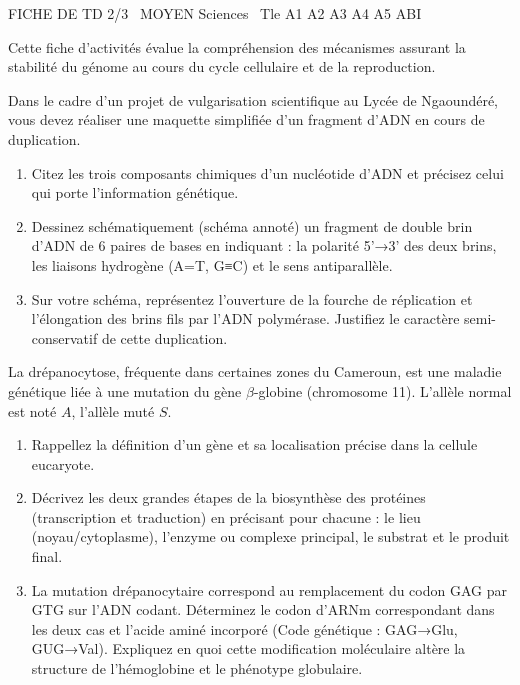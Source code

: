 \documentclass[11pt]{article}
\begin{document}
\begin{tcolorbox}[enhanced,colback=popink,colframe=popink,arc=10pt,boxrule=0pt,left=12pt,right=12pt,top=9pt,bottom=9pt]
{\color{white}\popxbold\small FICHE DE TD 2/3 \textbullet\ MOYEN \hfill Sciences \textbullet\ Tle A1 A2 A3 A4 A5 ABI\par}
\end{tcolorbox}
\vspace{4pt}
Cette fiche d'activités évalue la compréhension des mécanismes assurant la stabilité du génome au cours du cycle cellulaire et de la reproduction.

\begin{exercice}
Dans le cadre d'un projet de vulgarisation scientifique au Lycée de Ngaoundéré, vous devez réaliser une maquette simplifiée d'un fragment d'ADN en cours de duplication.
\begin{enumerate}
    \item Citez les trois composants chimiques d'un nucléotide d'ADN et précisez celui qui porte l'information génétique.
    \item Dessinez schématiquement (schéma annoté) un fragment de double brin d'ADN de 6 paires de bases en indiquant : la polarité 5'→3' des deux brins, les liaisons hydrogène (A=T, G≡C) et le sens antiparallèle.
    \item Sur votre schéma, représentez l'ouverture de la fourche de réplication et l'élongation des brins fils par l'ADN polymérase. Justifiez le caractère \og semi-conservatif \fg{} de cette duplication.
\end{enumerate}
\end{exercice}

\begin{exercice}
La drépanocytose, fréquente dans certaines zones du Cameroun, est une maladie génétique liée à une mutation du gène $\beta$-globine (chromosome 11). L'allèle normal est noté $A$, l'allèle muté $S$.
\begin{enumerate}
    \item Rappellez la définition d'un gène et sa localisation précise dans la cellule eucaryote.
    \item Décrivez les deux grandes étapes de la biosynthèse des protéines (transcription et traduction) en précisant pour chacune : le lieu (noyau/cytoplasme), l'enzyme ou complexe principal, le substrat et le produit final.
    \item La mutation drépanocytaire correspond au remplacement du codon GAG par GTG sur l'ADN codant. Déterminez le codon d'ARNm correspondant dans les deux cas et l'acide aminé incorporé (Code génétique : GAG→Glu, GUG→Val). Expliquez en quoi cette modification moléculaire altère la structure de l'hémoglobine et le phénotype globulaire.
\end{enumerate}
\end{exercice}
\end{document}
